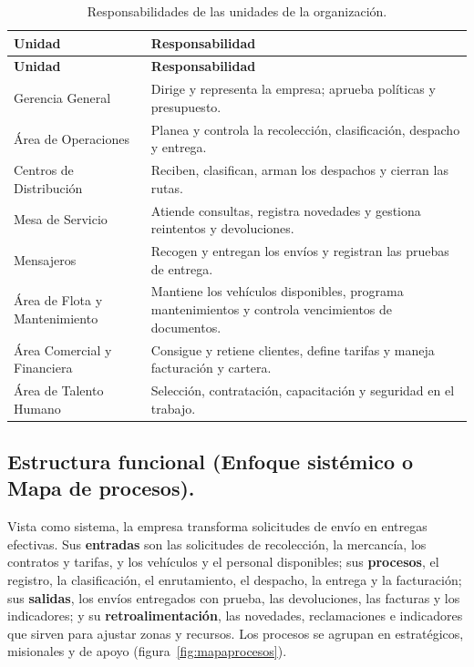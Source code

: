 {\singlespacing\small
\begin{longtable}{L{4.2cm} L{10.2cm}}
\caption{Responsabilidades de las unidades de la organización.}
\label{tab:responsabilidades}\\
\toprule
\textbf{Unidad} & \textbf{Responsabilidad} \\
\midrule
\endfirsthead
\toprule
\textbf{Unidad} & \textbf{Responsabilidad} \\
\midrule
\endhead
\bottomrule
\endfoot
Gerencia General & Dirige y representa la empresa; aprueba políticas y presupuesto. \\
Área de Operaciones & Planea y controla la recolección, clasificación, despacho y entrega. \\
\quad Centros de Distribución & Reciben, clasifican, arman los despachos y cierran las rutas. \\
\quad Mesa de Servicio & Atiende consultas, registra novedades y gestiona reintentos y devoluciones. \\
\quad Mensajeros & Recogen y entregan los envíos y registran las pruebas de entrega. \\
Área de Flota y Mantenimiento & Mantiene los vehículos disponibles, programa mantenimientos y controla vencimientos de documentos. \\
Área Comercial y Financiera & Consigue y retiene clientes, define tarifas y maneja facturación y cartera. \\
Área de Talento Humano & Selección, contratación, capacitación y seguridad en el trabajo. \\
\end{longtable}
\par}

\subsection{Estructura funcional (Enfoque sistémico o Mapa de procesos).}

Vista como sistema, la empresa transforma solicitudes de envío en
entregas efectivas. Sus \textbf{entradas} son las solicitudes de
recolección, la mercancía, los contratos y tarifas, y los vehículos y el
personal disponibles; sus \textbf{procesos}, el registro, la
clasificación, el enrutamiento, el despacho, la entrega y la
facturación; sus \textbf{salidas}, los envíos entregados con prueba, las
devoluciones, las facturas y los indicadores; y su
\textbf{retroalimentación}, las novedades, reclamaciones e indicadores
que sirven para ajustar zonas y recursos. Los procesos se agrupan en
estratégicos, misionales y de apoyo (figura~\ref{fig:mapaprocesos}).

